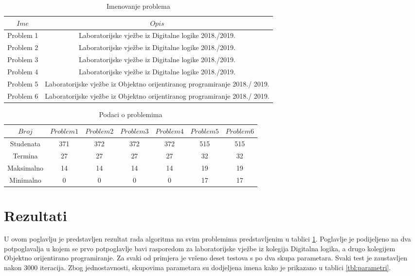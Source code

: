 \documentclass[times, utf8, zavrsni]{fer}
\begin{document}
\begin{table}
  \caption{Imenovanje problema}
  \label{tbl:opis_problema}
  \centering
  \begin{tabular}{c | c }
    $Ime$ & $Opis$    \\ \hline
    Problem 1 & Laboratorijske vježbe iz Digitalne logike 2018./2019. \\ \hline
    Problem 2 & Laboratorijske vježbe iz Digitalne logike 2018./2019. \\ \hline
    Problem 3 & Laboratorijske vježbe iz Digitalne logike 2018./2019. \\ \hline
    Problem 4 & Laboratorijske vježbe iz Digitalne logike 2018./2019. \\ \hline
    Problem 5 & Laboratorijske vježbe iz Objektno orijentiranog programiranje 2018./ 2019. \\ \hline
    Problem 6 & Laboratorijske vježbe iz Objektno orijentiranog programiranje 2018./ 2019.
  \end{tabular}
\end{table}

\begin{table}
  \caption{Podaci o problemima}
  \label{tbl:podaci_problema}
  \centering
  \begin{tabular}{c | c | c | c | c | c | c  }
    $Broj$     &  $Problem 1$ & $Problem 2$ & $Problem 3$ & $Problem 4$ & $Problem 5$ & $Problem 6$ \\ \hline
    Studenata  &  371       & 372       & 372       & 372       & 515       & 515       \\ \hline
    Termina    &  27        & 27        & 27        & 27        & 32        & 32        \\ \hline
    Maksimalno &  14        & 14        & 14        & 14        & 19        & 19        \\ \hline
    Minimalno  &  0         & 0         & 0         & 0         & 17        & 17
  \end{tabular}
\end{table}




\section{Rezultati}
U ovom poglavlju je predstavljen rezultat rada algoritma na svim problemima predstavljenim u tablici \ref{tbl:opis_problema}. Poglavlje je podijeljeno na dva potpoglavalja
u kojem se prvo potpoglavlje bavi rasporedom za laboratorijske vježbe iz kolegija Digitalna logika, a drugo kolegijem Objektno orijentirano programiranje. Za svaki od primjera
je vršeno deset testova s po dva skupa parametara. Svaki test je zaustavljen nakon $3000$ iteracija. Zbog jednostavnosti, skupovima parametara su dodjeljena imena kako je
 prikazano u tablici \ref{tbl:parametri}.
\end{document}
